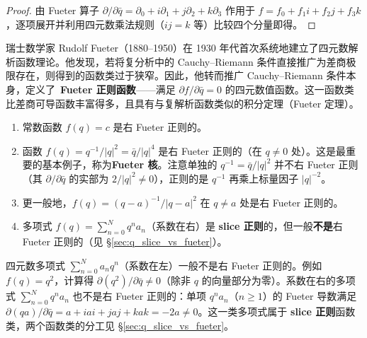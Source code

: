 \begin{proof}
由 Fueter 算子 $\partial/\partial\bar q=\partial_0+i\partial_1+j\partial_2+k\partial_3$ 作用于 $f=f_0+f_1i+f_2j+f_3k$，逐项展开并利用四元数乘法规则（$ij=k$ 等）比较四个分量即得。
\end{proof}

\begin{remark}\label{rem:q_fueter_history}
瑞士数学家 Rudolf Fueter（1880--1950）在 1930 年代首次系统地建立了四元数解析函数理论。他发现，若将复分析中的 Cauchy--Riemann 条件直接推广为差商极限存在，则得到的函数类过于狭窄。因此，他转而推广 Cauchy--Riemann 条件本身，定义了\ \textbf{Fueter 正则函数}——满足 $\partial f/\partial \bar q=0$ 的四元数值函数。这一函数类比差商可导函数丰富得多，且具有与复解析函数类似的积分定理（Fueter 定理）。
\end{remark}

\begin{example}[四元数正则函数的实例]\label{ex:q_regular_examples}
\begin{enumerate}[label=(\roman*)]
    \item 常数函数 $f(q)=c$ 是右 Fueter 正则的。
    \item 函数 $f(q)=q^{-1}/|q|^2=\bar q/|q|^4$ 是右 Fueter 正则的（在 $q\neq 0$ 处）。这是最重要的基本例子，称为\textbf{Fueter 核}。注意单独的 $q^{-1}=\bar q/|q|^2$ 并不右 Fueter 正则（其 $\partial/\partial\bar q$ 的实部为 $2/|q|^2\neq 0$），正则的是 $q^{-1}$ 再乘上标量因子 $|q|^{-2}$。
    \item 更一般地，$f(q)=(q-a)^{-1}/|q-a|^2$ 在 $q\neq a$ 处是右 Fueter 正则的。
    \item 多项式 $f(q)=\sum_{n=0}^N q^n a_n$（系数在右）是 \textbf{slice 正则}的，但一般\textbf{不是}右 Fueter 正则的（见 \S\ref{sec:q_slice_vs_fueter}）。
\end{enumerate}
\end{example}

\begin{remark}\label{rem:q_polynomial_not_regular}
四元数多项式 $\sum_{n=0}^N a_n q^n$（系数在左）一般不是右 Fueter 正则的。例如 $f(q)=q^2$，计算得 $\partial(q^2)/\partial\bar q\neq 0$（除非 $q$ 的向量部分为零）。系数在右的多项式 $\sum_{n=0}^N q^n a_n$ 也不是右 Fueter 正则的：单项 $q^n a_n$（$n\ge 1$）的 Fueter 导数满足 $\partial(qa)/\partial\bar q=a+iai+jaj+kak=-2a\neq 0$。这一类多项式属于 \textbf{slice 正则}函数类，两个函数类的分工见 \S\ref{sec:q_slice_vs_fueter}。
\end{remark}

